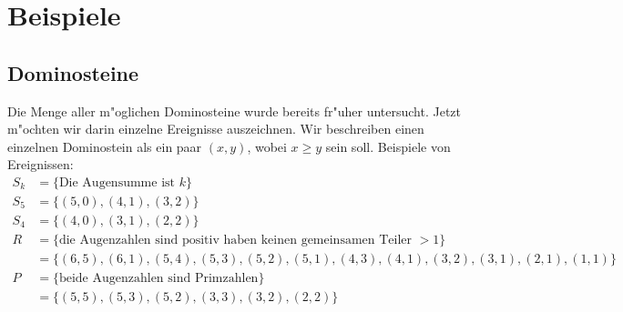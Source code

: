 \section{Beispiele\label{section-beispiele}}
\subsection{Dominosteine}
Die Menge aller m"oglichen Dominosteine wurde bereits fr"uher untersucht.
Jetzt m"ochten wir darin einzelne Ereignisse auszeichnen. Wir beschreiben
einen einzelnen Dominostein als ein paar $(x,y)$, wobei $x\ge y$ sein soll.
Beispiele von Ereignissen:
\begin{align*}
S_k&=\{ \text{Die Augensumme ist $k$}\}\\
S_5&=\{ (5,0), (4,1), (3,2) \}\\
S_4&=\{ (4,0), (3,1), (2,2) \}\\
R&=\{\text{die Augenzahlen sind positiv haben keinen gemeinsamen Teiler $>1$}\}\\
 &=\{ (6,5), (6,1), (5,4), (5,3), (5,2), (5,1), (4,3), (4,1), (3,2), (3,1), (2,1), (1,1) \}
\\
P&=\{\text{beide Augenzahlen sind Primzahlen}\}\\
 &=\{(5,5), (5,3), (5,2), (3,3), (3,2), (2,2) \}\\
\end{align*}

